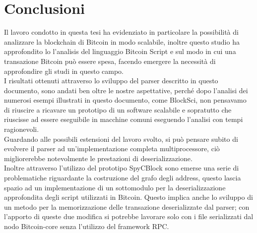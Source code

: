 \chapter{Conclusioni}\label{chap:conclusioni}

Il lavoro condotto in questa tesi ha evidenziato in particolare la possibilità di analizzare la blockchain di Bitcoin in modo scalabile, inoltre questo studio ha approfondito lo l'analisis del linguaggio Bitcoin Script e sul modo in cui una transazione Bitcoin può essere spesa, facendo emergere la necessità di approfondire gli studi in questo campo.\\
I risultati ottenuti attraverso lo sviluppo del parser descritto in questo documento, sono andati ben oltre le nostre aspettative, perché dopo l'analisi dei numerosi esempi illustrati in questo documento, come BlockSci, non pensavamo di riuscire a ricavare un prototipo di un software scalabile e sopratutto che riuscisse ad essere eseguibile in macchine comuni eseguendo l'analisi con tempi ragionevoli.\\
Guardando alle possibili estensioni del lavoro svolto, si può pensare subito di evolvere il parser ad un'implementazione completa multiprocessore, ciò migliorerebbe notevolmente le prestazioni di deserializzazione.\\
Inoltre attraverso l'utilizzo del prototipo SpyCBlock sono emerse una serie di problematiche riguardante la costruzione del grafo degli address, questo lascia spazio ad un implementazione di un sottomodulo per la deserializzazione approfondita degli script utilizzati in Bitcoin. Questo implica anche lo sviluppo di un metodo per la memorizzazione delle transazione deserializzate dal parser; con l'apporto di queste due modifica si potrebbe lavorare solo con i file serializzati dal nodo Bitcoin-core senza l'utilizzo del framework RPC.
